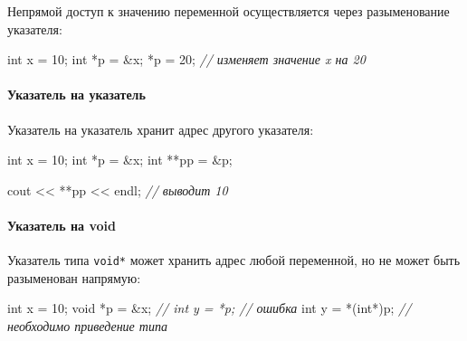 \documentclass[
]{article}
\newenvironment{Shaded}{}{}
\newcommand{\CommentTok}[1]{\textcolor[rgb]{0.38,0.63,0.69}{\textit{#1}}}
\newcommand{\DataTypeTok}[1]{\textcolor[rgb]{0.56,0.13,0.00}{#1}}
\newcommand{\DecValTok}[1]{\textcolor[rgb]{0.25,0.63,0.44}{#1}}
\newcommand{\NormalTok}[1]{#1}
\newcommand{\OperatorTok}[1]{\textcolor[rgb]{0.40,0.40,0.40}{#1}}
\begin{document}
Непрямой доступ к значению переменной осуществляется через разыменование
указателя:

\begin{Shaded}
\begin{Highlighting}[]
\DataTypeTok{int}\NormalTok{ x }\OperatorTok{=} \DecValTok{10}\OperatorTok{;}
\DataTypeTok{int} \OperatorTok{*}\NormalTok{p }\OperatorTok{=} \OperatorTok{\&}\NormalTok{x}\OperatorTok{;}
\OperatorTok{*}\NormalTok{p }\OperatorTok{=} \DecValTok{20}\OperatorTok{;} \CommentTok{// изменяет значение x на 20}
\end{Highlighting}
\end{Shaded}

\paragraph{Указатель на
указатель}\label{ux443ux43aux430ux437ux430ux442ux435ux43bux44c-ux43dux430-ux443ux43aux430ux437ux430ux442ux435ux43bux44c}

Указатель на указатель хранит адрес другого указателя:

\begin{Shaded}
\begin{Highlighting}[]
\DataTypeTok{int}\NormalTok{ x }\OperatorTok{=} \DecValTok{10}\OperatorTok{;}
\DataTypeTok{int} \OperatorTok{*}\NormalTok{p }\OperatorTok{=} \OperatorTok{\&}\NormalTok{x}\OperatorTok{;}
\DataTypeTok{int} \OperatorTok{**}\NormalTok{pp }\OperatorTok{=} \OperatorTok{\&}\NormalTok{p}\OperatorTok{;}

\NormalTok{cout }\OperatorTok{\textless{}\textless{}} \OperatorTok{**}\NormalTok{pp }\OperatorTok{\textless{}\textless{}}\NormalTok{ endl}\OperatorTok{;} \CommentTok{// выводит 10}
\end{Highlighting}
\end{Shaded}

\paragraph{Указатель на
void}\label{ux443ux43aux430ux437ux430ux442ux435ux43bux44c-ux43dux430-void}

Указатель типа \texttt{void*} может хранить адрес любой переменной, но
не может быть разыменован напрямую:

\begin{Shaded}
\begin{Highlighting}[]
\DataTypeTok{int}\NormalTok{ x }\OperatorTok{=} \DecValTok{10}\OperatorTok{;}
\DataTypeTok{void} \OperatorTok{*}\NormalTok{p }\OperatorTok{=} \OperatorTok{\&}\NormalTok{x}\OperatorTok{;}
\CommentTok{// int y = *p; // ошибка}
\DataTypeTok{int}\NormalTok{ y }\OperatorTok{=} \OperatorTok{*(}\DataTypeTok{int}\OperatorTok{*)}\NormalTok{p}\OperatorTok{;} \CommentTok{// необходимо приведение типа}
\end{Highlighting}
\end{Shaded}
\end{document}
